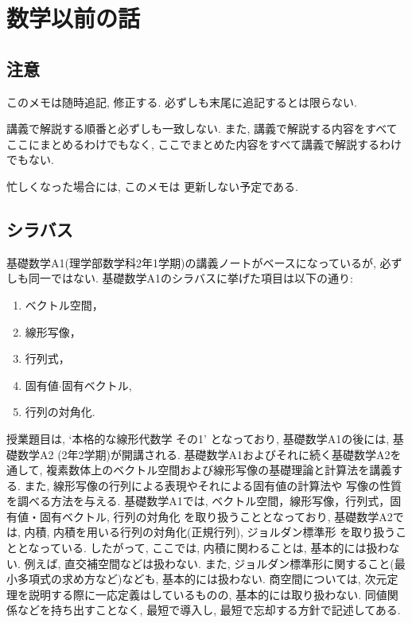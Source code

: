 \frontmatter
\let\originalthesection\thesection
\renewcommand{\thesection}{\alph{section}}

\chapter{数学以前の話}
\section{注意}
このメモは随時追記, 修正する.
必ずしも末尾に追記するとは限らない.

講義で解説する順番と必ずしも一致しない.
また, 講義で解説する内容をすべてここにまとめるわけでもなく,
ここでまとめた内容をすべて講義で解説するわけでもない.

忙しくなった場合には,
このメモは
更新しない予定である.

\section{シラバス}
基礎数学A1(理学部数学科2年1学期)の講義ノートがベースになっているが,
必ずしも同一ではない.
基礎数学A1のシラバスに挙げた項目は以下の通り:
\begin{enumerate}
\item
  ベクトル空間，
\item 線形写像，
\item 行列式，
\item 固有値$\cdot$固有ベクトル,
\item 行列の対角化.
\end{enumerate}

授業題目は,
`本格的な線形代数学 その1'
となっており,
基礎数学A1の後には, 基礎数学A2 (2年2学期)が開講される.
基礎数学A1およびそれに続く基礎数学A2を通して,
複素数体上のベクトル空間および線形写像の基礎理論と計算法を講義する.
また, 線形写像の行列による表現やそれによる固有値の計算法や
写像の性質を調べる方法を与える.
基礎数学A1では,
ベクトル空間，線形写像，行列式，固有値・固有ベクトル, 行列の対角化
を取り扱うこととなっており,
基礎数学A2では,
内積, 内積を用いる行列の対角化(正規行列),
ジョルダン標準形
を取り扱うこととなっている.
したがって,
ここでは, 
内積に関わることは,
基本的には扱わない.
例えば,
直交補空間などは扱わない.
また, ジョルダン標準形に関すること(最小多項式の求め方など)なども,
基本的には扱わない.
商空間については,
次元定理を説明する際に一応定義はしているものの,
基本的には取り扱わない.
同値関係などを持ち出すことなく,
最短で導入し, 最短で忘却する方針で記述してある.

